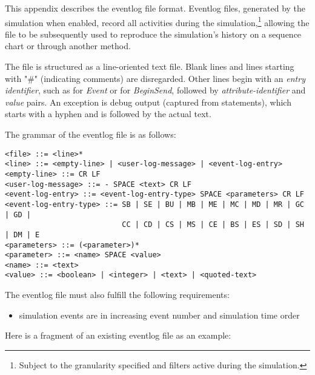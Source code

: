 \label{cha:eventlog-file-format}

This appendix describes the eventlog file format. Eventlog files, generated by
the simulation when enabled, record all activities during the
simulation,\footnote{Subject to the granularity specified and filters active
during the simulation.} allowing the file to be subsequently used to reproduce
the simulation's history on a sequence chart or through another method.

The file is structured as a line-oriented text file. Blank lines and lines
starting with "\#" (indicating comments) are disregarded. Other lines begin with
an \textit{entry identifier}, such as  for \textit{Event} or  for
\textit{BeginSend}, followed by \textit{attribute-identifier} and \textit{value}
pairs. An exception is debug output (captured from  statements),
which starts with a hyphen and is followed by the actual text.

The grammar of the eventlog file is as follows:

\begin{verbatim}
<file> ::= <line>*
<line> ::= <empty-line> | <user-log-message> | <event-log-entry>
<empty-line> ::= CR LF
<user-log-message> ::= - SPACE <text> CR LF
<event-log-entry> ::= <event-log-entry-type> SPACE <parameters> CR LF
<event-log-entry-type> ::= SB | SE | BU | MB | ME | MC | MD | MR | GC | GD |
                           CC | CD | CS | MS | CE | BS | ES | SD | SH | DM | E
<parameters> ::= (<parameter>)*
<parameter> ::= <name> SPACE <value>
<name> ::= <text>
<value> ::= <boolean> | <integer> | <text> | <quoted-text>
\end{verbatim}

The eventlog file must also fulfill the following requirements:
\begin{itemize}
   \item simulation events are in increasing event number and simulation time order
\end{itemize}

Here is a fragment of an existing eventlog file as an example:


